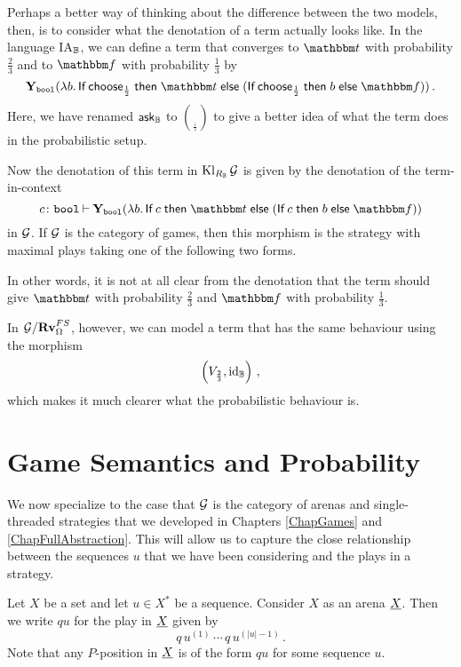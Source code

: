 \documentclass{report}[11pt]
\begin{document}
Perhaps a better way of thinking about the difference between the two models, then, is to consider what the denotation of a term actually looks like.  
In the language IA${}_{\mathbb{B}}$, we can define a term that converges to $\true$ with probability $\frac23$ and to $\false$ with probability $\frac13$ by
\[
  \Y_\bool(\lambda b.\If \choose_{\frac12} \Then \true \Else (\If \choose_{\frac12} \Then b \Else \false))\,.
  \]
Here, we have renamed $\operatorname{{\mathsf{ask}}}_{\mathbb{B}}$ to $\choose_{\frac12}$ to give a better idea of what the term does in the probabilistic setup.

Now the denotation of this term in $\operatorname{Kl}_{R_{\mathbb{B}}}\mathcal G$ is given by the denotation of the term-in-context
\[
  c\from\bool\ts\Y_{\bool}(\lambda b.\If c \Then \true \Else (\If c \Then b \Else \false))
  \]
in $\mathcal G$.
If $\mathcal G$ is the category of games, then this morphism is the strategy with maximal plays taking one of the following two forms.
In other words, it is not at all clear from the denotation that the term should give $\true$ with probability $\frac23$ and $\false$ with probability $\frac13$.

In $\mathcal G/{\normalfont\textbf{Rv}}_{\Omega}^{FS}$, however, we can model a term that has the same behaviour using the morphism
\[
  \left(V_{\frac23}, \operatorname{id}_{\mathbb{B}}\right)\,,
  \]
which makes it much clearer what the probabilistic behaviour is.

\section{Game Semantics and Probability}

We now specialize to the case that $\mathcal G$ is the category of arenas and single-threaded strategies that we developed in Chapters \ref{ChapGames} and \ref{ChapFullAbstraction}.
This will allow us to capture the close relationship between the sequences $u$ that we have been considering and the plays in a strategy.

\begin{definition}
  Let $X$ be a set and let $u\in X^*$ be a sequence.  
  Consider $X$ as an arena ${\underline{X}}$.  
  Then we write $qu$ for the play in ${\underline{X}}$ given by
  \[
    q\,u^{(1)}\,\cdots\,q\,u^{(|u|-1)}\,.
    \]
  Note that any $P$-position in ${\underline{X}}$ is of the form $qu$ for some sequence $u$.  
\end{definition}
\end{document}

